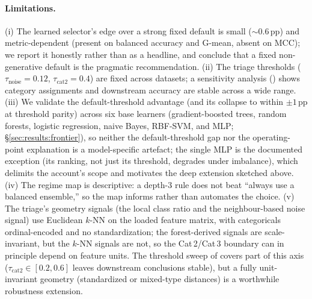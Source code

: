 \paragraph{Limitations.} (i) The learned selector's edge over a strong fixed
default is small ($\sim$0.6\,pp) and metric-dependent (present on balanced
accuracy and G-mean, absent on MCC); we report it honestly rather than as a
headline, and conclude that a fixed non-generative default is the pragmatic
recommendation. (ii) The triage thresholds ($\tau_{\text{noise}}=0.12$,
$\tau_{\text{cat2}}=0.4$) are fixed across datasets; a sensitivity analysis
() shows category assignments and downstream
accuracy are stable across a wide range. (iii) We validate the default-threshold
advantage (and its collapse to within $\pm1$\,pp at threshold parity) across
six base learners (gradient-boosted trees, random forests, logistic regression,
naive Bayes, RBF-SVM, and MLP; \S\ref{sec:results:frontier}), so neither the
default-threshold gap nor
the operating-point explanation is a model-specific artefact; the single MLP is
the documented exception (its ranking, not just its threshold, degrades under
imbalance), which delimits the account's scope and motivates the deep extension
sketched above. (iv) The regime map is descriptive: a depth-3 rule does not beat
``always use a balanced ensemble,'' so the map informs rather than automates the
choice. (v) The triage's geometry signals (the local class ratio and the
neighbour-based noise signal) use Euclidean $k$-NN on the loaded feature matrix,
with categoricals ordinal-encoded and no standardization; the forest-derived
signals are scale-invariant, but the $k$-NN signals are not, so the
Cat\,2/Cat\,3 boundary can in principle depend on feature units. The threshold
sweep of  covers part of this axis
($\tau_{\text{cat2}}\in[0.2,0.6]$ leaves downstream conclusions stable), but a
fully unit-invariant geometry (standardized or mixed-type distances) is a
worthwhile robustness extension.
